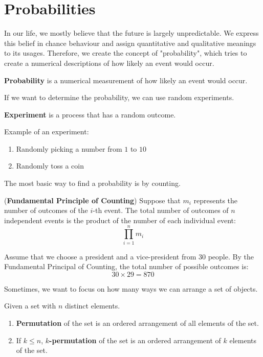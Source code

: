 \documentclass{huhtakm-template-book}
\begin{document}
\section{Probabilities}
In our life, we mostly believe that the future is largely unpredictable. We express this belief in chance behaviour and assign quantitative and qualitative meanings to its usages. Therefore, we create the concept of "probability", which tries to create a numerical descriptions of how likely an event would occur.
\begin{defn}
	\textbf{Probability} is a numerical measurement of how likely an event would occur.
\end{defn}
If we want to determine the probability, we can use random experiments.
\begin{defn}
	\textbf{Experiment} is a process that has a random outcome.
\end{defn}
\begin{eg}
	Example of an experiment:
	\begin{enumerate}
		\item Randomly picking a number from $1$ to $10$
		\item Randomly toss a coin
	\end{enumerate}
\end{eg}
The most basic way to find a probability is by counting.
\begin{thm}(\textbf{Fundamental Principle of Counting})
	Suppose that $m_{i}$ represents the number of outcomes of the $i$-th event. The total number of outcomes of $n$ independent events is the product of the number of each individual event:
	\begin{equation*}
		\prod_{i=1}^{n}m_{i}
	\end{equation*} 
\end{thm}
\begin{eg}
	Assume that we choose a president and a vice-president from $30$ people. By the Fundamental Principal of Counting, the total number of possible outcomes is:
	\begin{equation*}
		30\times 29=870
	\end{equation*}
\end{eg}
Sometimes, we want to focus on how many ways we can arrange a set of objects.
\begin{defn}
	Given a set with $n$ distinct elements.
	\begin{enumerate}
		\item \textbf{Permutation} of the set is an ordered arrangement of all elements of the set.
		\item If $k\leq n$, \textbf{$k$-permutation} of the set is an ordered arrangement of $k$ elements of the set.
	\end{enumerate}
\end{defn}
\end{document}
